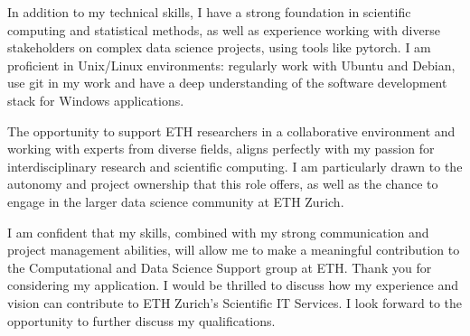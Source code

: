 \documentclass[11pt,a4paper,sans]{moderncv}
\begin{document}
In addition to my technical skills, I have a strong foundation in scientific computing and statistical methods, as well as experience working with diverse stakeholders on complex data science projects, using tools like pytorch. I am proficient in Unix/Linux environments: regularly work with Ubuntu and Debian, use git in my work and have a deep understanding of the software development stack for Windows applications.

The opportunity to support ETH researchers in a collaborative environment and working with experts from diverse fields, aligns perfectly with my passion for interdisciplinary research and scientific computing. I am particularly drawn to the autonomy and project ownership that this role offers, as well as the chance to engage in the larger data science community at ETH Zurich. 

\vspace{3cm}

I am confident that my skills, combined with my strong communication and project management abilities, will allow me to make a meaningful contribution to the Computational and Data Science Support group at ETH.
Thank you for considering my application. I would be thrilled to discuss how my experience and vision can contribute to ETH Zurich’s Scientific IT Services. I look forward to the opportunity to further discuss my qualifications.



\makeletterclosing
\end{document}
